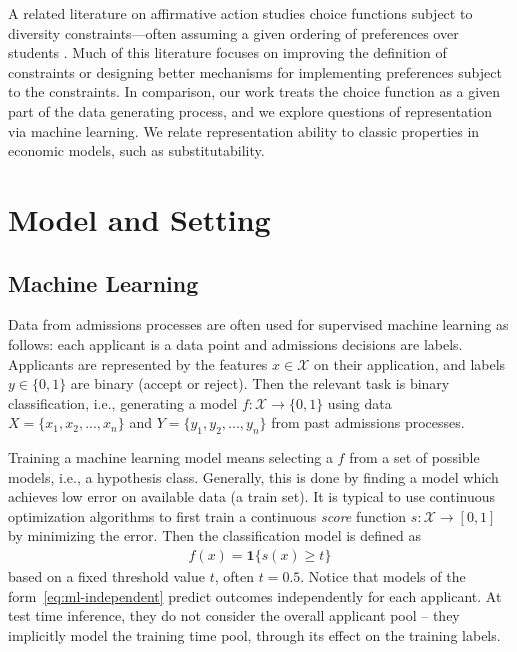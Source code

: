 \documentclass[letterpaper]{article}
\newcommand{\calX}{\mathcal{X}}
\begin{document}
A related literature on affirmative action studies choice functions subject to diversity constraints---often assuming a given ordering of preferences over students \citep{echenique2015control,celebi2023diversity,arnosti2024explainable}. Much of this literature focuses on improving the definition of constraints or designing better mechanisms for implementing preferences subject to the constraints.
In comparison, our work treats the choice function as a given part of the data generating process, and we explore questions of representation via machine learning. We relate representation ability to classic properties in economic models, such as substitutability.

\section{Model and Setting} \label{sec:setting}

\subsection{Machine Learning}

Data from admissions processes are often used for supervised machine learning as follows:  each applicant is a data point and admissions decisions are labels.
Applicants are represented by the features $x\in\mathcal X$ on their application, and labels $y\in\{0,1\}$ are binary (accept or reject).
Then the relevant task is binary classification, i.e., generating a model
${f}: \calX \to \{0, 1\}$ using data $X = \{x_1, x_2, ..., x_n\}$ and $Y = \{y_1, y_2, ..., y_n\}$ from past admissions processes.

Training a machine learning model means selecting a $f$ from a set of possible models, i.e., a hypothesis class.
Generally, this is done by finding a model which achieves low error on available data (a train set).
It is typical to use continuous optimization algorithms to first train a continuous \emph{score} function $s:\mathcal X\to [0,1]$ by minimizing the error.
Then the classification model is defined as
\begin{align}\label{eq:ml-independent}
    f(x) = \mathbf 1\{s(x)\geq t\}
\end{align} based on a fixed threshold value $t$, often $t=0.5$.
Notice that models of the form~\eqref{eq:ml-independent} predict outcomes independently for each applicant.
At test time inference, they do not consider the overall applicant pool -- they implicitly model the training time pool, through its effect on the training labels.
\end{document}

